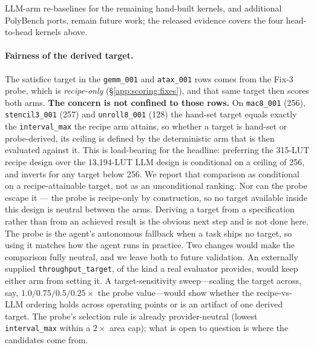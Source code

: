 LLM-arm re-baselines for the remaining hand-built kernels, and additional PolyBench
ports, remain future work; the released evidence covers the four head-to-head kernels
above.

\paragraph{Fairness of the derived target.} The satisfice target in the
\texttt{gemm\_001} and \texttt{atax\_001} rows comes from the Fix-3 probe, which is
\emph{recipe-only} (\S\ref{app:scoring:fixes}), and that same target then scores both
arms. \textbf{The concern is not confined to those rows.} On
\texttt{mac8\_001} (256), \texttt{stencil3\_001} (257) and \texttt{unroll8\_001}
(128) the hand-set target equals exactly the \texttt{interval\_max} the recipe arm
attains, so whether a target is hand-set or probe-derived, its ceiling is defined by
the deterministic arm that is then evaluated against it. This is load-bearing for the
headline: preferring the 315-LUT recipe design over the 13{,}194-LUT LLM design is
conditional on a ceiling of 256, and inverts for any target below 256. We report that
comparison as conditional on a recipe-attainable target, not as an unconditional
ranking. Nor can the probe escape it --- the probe is recipe-only by construction, so
no target available inside this design is neutral between the arms. Deriving a target
from a specification rather than from an achieved result is the obvious next step and
is not done here. The probe is the agent's autonomous fallback when a task ships no
target, so using it matches how the agent runs in practice. Two changes would make the comparison
fully neutral, and we leave both to future validation. An externally supplied
\texttt{throughput\_target}, of the kind a real evaluator provides, would keep either
arm from setting it. A target-sensitivity sweep---scaling the target across, say,
$1.0/0.75/0.5/0.25\times$ the probe value---would show whether the recipe-vs-LLM
ordering holds across operating points or is an artifact of one derived target. The
probe's selection rule is already provider-neutral (lowest \texttt{interval\_max}
within a $2\times$ area cap); what is open to question is where the candidates come
from.

